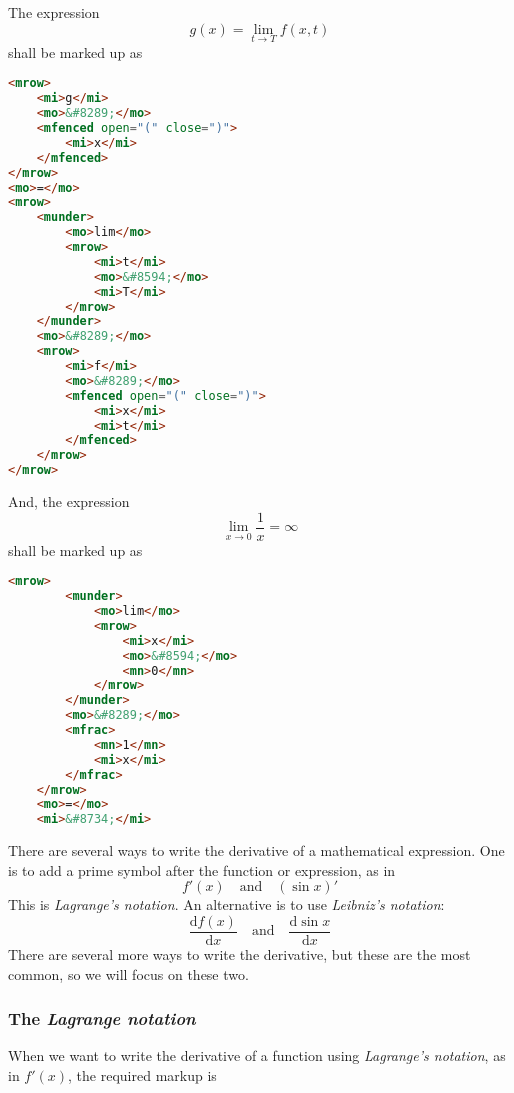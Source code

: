 \documentclass[english,a4paper,11pt]{article}
\begin{document}
\begin{eksempler}
	
	The expression 
\begin{equation}
g(x) =\lim_{t \rightarrow T} f(x,t)
\end{equation}
shall be marked up as
\begin{lstlisting}[language=HTML]
<mrow>
	<mi>g</mi>
	<mo>&#8289;</mo>
	<mfenced open="(" close=")">
		<mi>x</mi>
	</mfenced>
</mrow>
<mo>=</mo>
<mrow>
	<munder>
		<mo>lim</mo>
		<mrow>
			<mi>t</mi>
			<mo>&#8594;</mo>
			<mi>T</mi>
		</mrow>
	</munder>
	<mo>&#8289;</mo>
	<mrow>
		<mi>f</mi>
		<mo>&#8289;</mo>
		<mfenced open="(" close=")">
			<mi>x</mi>
			<mi>t</mi>
		</mfenced>
	</mrow>
</mrow>
\end{lstlisting}

	And, the expression 
	\begin{equation}
	\lim_{x \rightarrow 0} \frac{1}{x} = \infty
	\end{equation}
	shall be marked up as
	\begin{lstlisting}[language=HTML]
	<mrow>
		<munder>
			<mo>lim</mo>
			<mrow>
				<mi>x</mi>
				<mo>&#8594;</mo>
				<mn>0</mn>
			</mrow>
		</munder>
		<mo>&#8289;</mo>
		<mfrac>
			<mn>1</mn>
			<mi>x</mi>
		</mfrac>
	</mrow>
	<mo>=</mo>
	<mi>&#8734;</mi>
	\end{lstlisting}
\end{eksempler}

\bigskip
There are several ways to write the derivative of a mathematical expression. One is to add a prime symbol after the function or expression, as in 
\begin{equation}
f'(x)\quad\text{and}\quad (\sin x)'
\end{equation}
This is \emph{Lagrange's notation}. An alternative is to use \emph{Leibniz's notation}:
\begin{equation}
\frac{\text{d}f(x)}{\text{d}x}\quad\text{and}\quad \frac{\text{d}\sin x}{\text{d}x}
\end{equation}
There are several more ways to write the derivative, but these are the most common, so we will focus on these two.

\subsubsection{The \emph{Lagrange notation}}
When we want to write the derivative of a function using \emph{Lagrange's notation}, as in $f'(x)$, the required markup is
\end{document}
